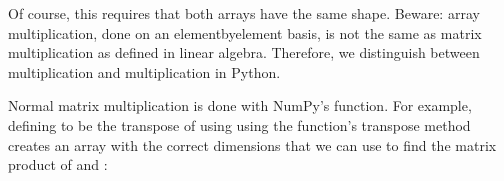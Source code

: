 \documentclass[letterpaper,10pt,english]{sphinxmanual}
\begin{document}
\begin{sphinxVerbatim}[commandchars=\\\{\},numbers=left,firstnumber=1,stepnumber=1]
\PYG{p}{[}\PYG{p}{[}   \PYG{p}{]}
\PYG{g+go}{                [ 9., 7., 4.]])}

\PYG{p}{[}\PYG{p}{[}  \PYG{p}{]}
\PYG{g+go}{                [3, 4, 5]])}

\PYG{p}{[}\PYG{p}{[}     \PYG{p}{]}
\PYG{g+go}{                [ 27., 28., 20.]])}
\end{sphinxVerbatim}

\sphinxAtStartPar
Of course, this requires that both arrays have the same shape.  Beware: array multiplication, done on an element\sphinxhyphen{}by\sphinxhyphen{}element basis, is not the same as matrix multiplication as defined in linear algebra. Therefore, we distinguish between  multiplication and  multiplication in Python.

\sphinxAtStartPar
Normal matrix multiplication is done with NumPy’s  function.  For example, defining  to be the transpose of  using using the  function’s  transpose method creates an array with the correct dimensions that we can use to find the matrix product of  and :

\begin{sphinxVerbatim}[commandchars=\\\{\},numbers=left,firstnumber=1,stepnumber=1]
  

\PYG{p}{[}\PYG{p}{[} \PYG{p}{]}
\PYG{g+go}{                [2, 5]])}

\PYG{p}{[}\PYG{p}{[}  \PYG{p}{]}
\PYG{g+go}{                [ 15., 75.]])}
\end{sphinxVerbatim}
\end{document}
